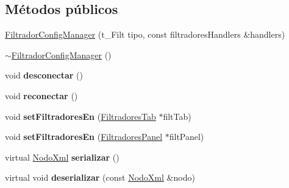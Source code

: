 \subsection*{\-Métodos públicos}
\begin{DoxyCompactItemize}
\item 
\hyperlink{classFiltradorConfigManager_a8e99972eddef35d1950804d6e6a37955}{\-Filtrador\-Config\-Manager} (t\-\_\-\-Filt tipo, const filtradores\-Handlers \&handlers)
\item 
\hyperlink{classFiltradorConfigManager_a14cd6656e2e4ce2a3be00067ea950fcb}{$\sim$\-Filtrador\-Config\-Manager} ()
\item 
\hypertarget{classFiltradorConfigManager_a212aba90eb786881f835ed34b7911aca}{void {\bfseries desconectar} ()}\label{classFiltradorConfigManager_a212aba90eb786881f835ed34b7911aca}

\item 
\hypertarget{classFiltradorConfigManager_aecdfe1a4b7586e9852921867883fbe7d}{void {\bfseries reconectar} ()}\label{classFiltradorConfigManager_aecdfe1a4b7586e9852921867883fbe7d}

\item 
\hypertarget{classFiltradorConfigManager_ae5fd61517aeeed02c65f1e231a1630f6}{void {\bfseries set\-Filtradores\-En} (\hyperlink{classFiltradoresTab}{\-Filtradores\-Tab} $\ast$filt\-Tab)}\label{classFiltradorConfigManager_ae5fd61517aeeed02c65f1e231a1630f6}

\item 
\hypertarget{classFiltradorConfigManager_abc34f32cec4bac96e55a79165a158d27}{void {\bfseries set\-Filtradores\-En} (\hyperlink{classFiltradoresPanel}{\-Filtradores\-Panel} $\ast$filt\-Panel)}\label{classFiltradorConfigManager_abc34f32cec4bac96e55a79165a158d27}

\item 
\hypertarget{classFiltradorConfigManager_ae81242279615ab8eceadf96754492406}{virtual \hyperlink{classTiXmlElement}{\-Nodo\-Xml} {\bfseries serializar} ()}\label{classFiltradorConfigManager_ae81242279615ab8eceadf96754492406}

\item 
\hypertarget{classFiltradorConfigManager_ac24f835cfd67f8c4073d909f42ffac36}{virtual void {\bfseries deserializar} (const \hyperlink{classTiXmlElement}{\-Nodo\-Xml} \&nodo)}\label{classFiltradorConfigManager_ac24f835cfd67f8c4073d909f42ffac36}

\end{DoxyCompactItemize}


